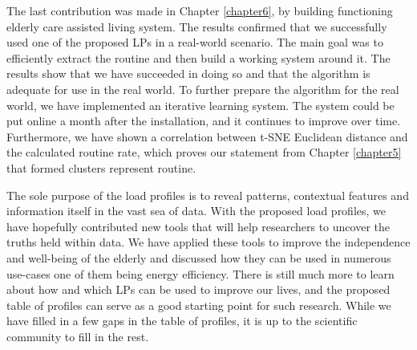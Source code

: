 The last contribution was made in Chapter \ref{chapter6}, by building functioning elderly care assisted living system. 
The results confirmed that we successfully used one of the proposed LPs in a real-world scenario. 
The main goal was to efficiently extract the routine and then build a working system around it.
The results show that we have succeeded in doing so and that the algorithm is adequate for use in the real world.
To further prepare the algorithm for the real world, we have implemented an iterative learning system.
The system could be put online a month after the installation, and it continues to improve over time.
Furthermore, we have shown a correlation between t-SNE Euclidean distance and the calculated routine rate,
which proves our statement from Chapter \ref{chapter5} that formed clusters represent routine.

The sole purpose of the load profiles is to reveal patterns, contextual features and information itself in the vast sea of data.
With the proposed load profiles, we have hopefully contributed new tools that will help researchers to uncover the truths held within data.
We have applied these tools to improve the independence and well-being of the elderly and discussed how they can be used in numerous use-cases one of them being energy efficiency.
There is still much more to learn about how and which LPs can be used to improve our lives, and the proposed table of profiles can serve as a good starting point for such research.
While we have filled in a few gaps in the table of profiles, it is up to the scientific community to fill in the rest.



